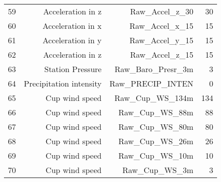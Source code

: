 \begin{longtable}{lrrr}
59 & Acceleration in z & Raw\_Accel\_z\_30 & 30\\
60 & Acceleration in x & Raw\_Accel\_x\_15 & 15\\
61 & Acceleration in y & Raw\_Accel\_y\_15 & 15\\
62 & Acceleration in z & Raw\_Accel\_z\_15 & 15\\
63 & Station Pressure & Raw\_Baro\_Presr\_3m & 3\\
64 & Precipitation intensity & Raw\_PRECIP\_INTEN & 0\\
65 & Cup wind speed & Raw\_Cup\_WS\_134m & 134\\
66 & Cup wind speed & Raw\_Cup\_WS\_88m & 88\\
67 & Cup wind speed & Raw\_Cup\_WS\_80m & 80\\
68 & Cup wind speed & Raw\_Cup\_WS\_26m & 26\\
69 & Cup wind speed & Raw\_Cup\_WS\_10m & 10\\
70 & Cup wind speed & Raw\_Cup\_WS\_3m & 3\\
\bottomrule
\end{longtable}

